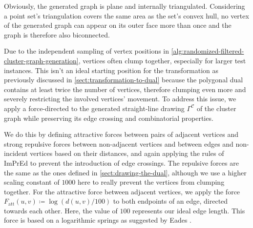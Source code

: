 Obviously, the generated graph is plane and internally triangulated.
Considering a point set's triangulation covers the same area as the set's convex hull, no vertex of the generated graph can appear on its outer face more than once and the graph is therefore also biconnected.

Due to the independent sampling of vertex positions in \cref{alg:randomized-filtered-cluster-graph-generation}, vertices often clump together, especially for larger test instances.
This isn't an ideal starting position for the transformation as previously discussed in \cref{sect:transformation-to-dual} because the polygonal dual contains at least twice the number of vertices, therefore clumping even more and severely restricting the involved vertices' movement.
To address this issue, we apply a force-directed  to the generated straight-line drawing $\Gamma^\mathcal{C}$ of the cluster graph while preserving its edge crossing and combinatorial properties.

We do this by defining attractive forces between pairs of adjacent vertices and strong repulsive forces between non-adjacent vertices and between edges and non-incident vertices based on their distances, and again applying the rules of ImPrEd \cite{simonetto2011impred} to prevent the introduction of edge crossings.
The repulsive forces are the same as the ones defined in \cref{sect:drawing-the-dual}, although we use a higher scaling constant of $1000$ here to really prevent the vertices from clumping together.
For the attractive force between adjacent vertices, we apply the force $F_\text{att}(u,v) \coloneqq \log(d(u,v) / 100)$ to both endpoints of an edge, directed towards each other.
Here, the value of $100$ represents our ideal edge length.
This force is based on a logarithmic springs as suggested by Eades \cite{eades84heuristic}.

\vfill

